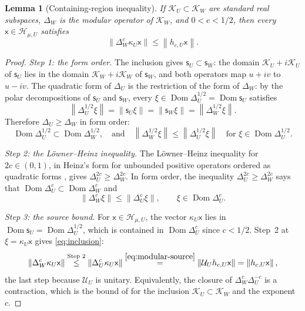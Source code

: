 \documentclass[11pt]{amsart}
\numberwithin{equation}{section}
\newtheorem{lemma}[theorem]{Lemma}
\theoremstyle{definition}
\newcommand{\Hh}{\mathcal H}
\newcommand{\sx}{\mathsf x}
\newcommand{\Dom}{\operatorname{Dom}}
\newcommand{\norm}[1]{\left\|#1\right\|}
\begin{document}
\begin{lemma}[Containing-region inequality]\label{lem:inclusion}
If \(\mathcal K_U\subset\mathcal K_W\) are standard real subspaces,
\(\Delta_W\) is the modular operator of \(\mathcal K_W\), and
\(0<c<1/2\), then every \(\sx\in\Hh_{\mu,U}\) satisfies
\begin{equation}
 \norm{\Delta_W^c\kappa_U\sx}\le\norm{h_{c,U}\sx}.
 \label{eq:inclusion}
\end{equation}
\end{lemma}

\begin{proof}
\emph{Step 1: the form order.} The inclusion gives
\(\mathsf s_U\subset\mathsf s_W\): the domain
\(\mathcal K_U+i\mathcal K_U\) of \(\mathsf s_U\) lies in the domain
\(\mathcal K_W+i\mathcal K_W\) of \(\mathsf s_W\), and both operators map
\(u+iv\) to \(u-iv\). The quadratic form of \(\Delta_U\) is the
restriction of the form of \(\Delta_W\): by the polar decompositions of
\(\mathsf s_U\) and \(\mathsf s_W\), every
\(\xi\in\Dom\Delta_U^{1/2}=\Dom\mathsf s_U\) satisfies
\[
 \norm{\Delta_U^{1/2}\xi}=\norm{\mathsf s_U\xi}
 =\norm{\mathsf s_W\xi}=\norm{\Delta_W^{1/2}\xi}.
\]
Therefore \(\Delta_U\ge\Delta_W\) in form order:
\[
 \Dom\Delta_U^{1/2}\subset\Dom\Delta_W^{1/2},\quad\text{and}\quad
 \norm{\Delta_W^{1/2}\xi}\le\norm{\Delta_U^{1/2}\xi}\quad\text{for }
 \xi\in\Dom\Delta_U^{1/2}.
\]

\smallskip
\emph{Step 2: the Löwner--Heinz inequality.} The
Löwner--Heinz inequality for \(2c\in(0,1)\), in Heinz's form for
unbounded positive operators ordered as quadratic forms
\cite[Satz~2]{Heinz51}, gives
\(\Delta_U^{2c}\ge\Delta_W^{2c}\). In form order, the inequality
\(\Delta_U^{2c}\ge\Delta_W^{2c}\) says that \(\Dom\Delta_U^c\subset\Dom\Delta_W^c\) and
\[
 \norm{\Delta_W^c\xi}\le\norm{\Delta_U^c\xi},\qquad
 \xi\in\Dom\Delta_U^c.
\]

\smallskip
\emph{Step 3: the source bound.} For \(\sx\in\Hh_{\mu,U}\), the vector
\(\kappa_U\sx\) lies in \(\Dom\mathsf s_U=\Dom\Delta_U^{1/2}\), which is
contained in \(\Dom\Delta_U^c\) since \(c<1/2\). Step~2 at
\(\xi=\kappa_U\sx\) gives
\eqref{eq:inclusion}:
\[
 \norm{\Delta_W^c\kappa_U\sx}
 \overset{\text{Step 2}}{\le}\norm{\Delta_U^c\kappa_U\sx}
 \overset{\eqref{eq:modular-source}}{=}\norm{\mathcal U_Uh_{c,U}\sx}
 =\norm{h_{c,U}\sx},
\]
the last step because \(\mathcal U_U\) is unitary.
Equivalently, the closure of \(\Delta_W^c\Delta_U^{-c}\) is a
contraction, which is the bound of \cite[Section~2]{BDL07} for the
inclusion \(\mathcal K_U\subset\mathcal K_W\) and the exponent \(c\).
\end{proof}
\end{document}
